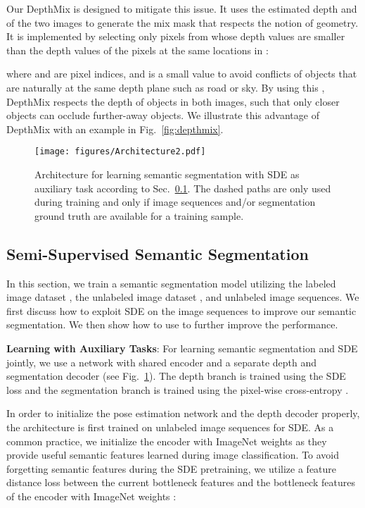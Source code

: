 \documentclass[final]{cvpr}
\begin{document}
Our DepthMix is designed to mitigate this issue. It uses the estimated depth  and  of the two images to generate the mix mask  that respects the notion of geometry. It is implemented by selecting only pixels from  whose depth values are smaller than the depth values of the pixels at the same locations in : 

where  and  are pixel indices, and  is a small value to avoid conflicts of objects that are naturally at the same depth plane such as road or sky.
By using this , DepthMix respects the depth of objects in both images, such that only closer objects can occlude further-away objects. We illustrate this advantage of DepthMix with an example in Fig.~\ref{fig:depthmix}.



\begin{figure}
\centering
\texttt{[image: figures/Architecture2.pdf]}
\caption{Architecture for learning semantic segmentation with SDE as auxiliary task according to Sec.~\ref{sec:semisupseg}. The dashed paths are only used during training and only if image sequences and/or segmentation ground truth are available for a training sample.}
\label{fig:architecture}
\end{figure}


\subsection{Semi-Supervised Semantic Segmentation}
\label{sec:semisupseg}

In this section, we train a semantic segmentation model utilizing the labeled image dataset , the unlabeled image dataset , and  unlabeled image sequences. We first discuss how to exploit SDE on the image sequences to improve our semantic segmentation. We then show how to use  to further improve the performance.

\noindent\textbf{Learning with Auxiliary Tasks}:
For learning semantic segmentation and SDE jointly, we use a network with shared encoder  and a separate depth  and segmentation decoder  (see Fig.~\ref{fig:architecture}). The depth branch is trained using the SDE loss  and the segmentation branch  is trained using the pixel-wise cross-entropy .

In order to initialize the pose estimation network and the depth decoder properly, the architecture is first trained on  unlabeled image sequences for SDE. As a common practice, we initialize the encoder with ImageNet weights as they provide useful semantic features learned during image classification. To avoid forgetting semantic features during the SDE pretraining, we utilize a feature distance loss between the current bottleneck features  and the bottleneck features of the encoder with ImageNet weights :
\end{document}
